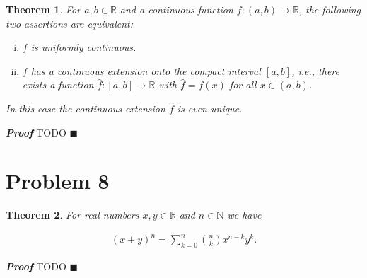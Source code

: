 \documentclass[]{article}
\newtheorem{theorem}{Theorem}
\newenvironment{proof}{\textit{\textbf{Proof}}}{\hfill$\blacksquare$}
\begin{document}
\begin{theorem}
	For $a,b \in \mathbb{R}$ and a continuous function $f : (a, b) \to \mathbb{R}$, the following two assertions are equivalent:
	
	\begin{enumerate}[(i)]
		\item $f$ is uniformly continuous.
		\item $f$ has a continuous extension onto the compact interval $[a,b]$, i.e., there exists a function $\hat{f} : [a, b] \to \mathbb{R}$ with $\hat{f}=f(x)$ for all $x \in (a, b)$.
	\end{enumerate}

	In this case the continuous extension $\hat{f}$ is even unique.
\end{theorem}

\begin{proof}
	TODO
\end{proof}

\section*{Problem 8}

\begin{theorem}
	For real numbers $x, y \in \mathbb{R}$ and $n \in \mathbb{N}$ we have
	
	\begin{align*}
		(x+y)^n = \sum_{k=0}^{n} \binom{n}{k} x^{n-k} y^k.
	\end{align*}
\end{theorem}

\begin{proof}
	TODO
\end{proof}
\end{document}
